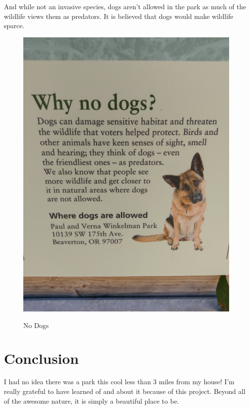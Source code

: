 \documentclass{article}
\begin{document}
And while not an invasive species, dogs aren't allowed in the park as much of the
wildlife views them as predators. It is believed that dogs would make wildlife sparce.
\begin{figure}[H]
\centering{}
\caption{No Dogs}
\includegraphics[scale=0.08]{no_dogs_sign.jpg}
\label{dogs}
\end{figure}
\newpage

\section{Conclusion}
I had no idea there was a park this cool less than 3 miles from my house! I'm really 
grateful to have learned of and about it because of this project. Beyond all of the 
awesome nature, it is simply a beautiful place to be.
\end{document}
